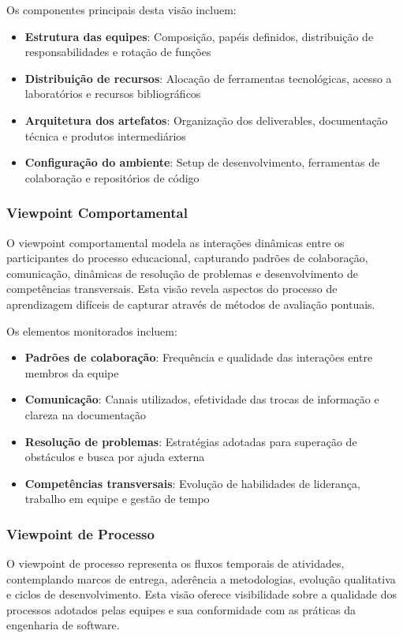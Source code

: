 \documentclass[english, spanish, brazilian]{modelo_dt}
\begin{document}
Os componentes principais desta visão incluem:
\begin{itemize}
  \item \textbf{Estrutura das equipes}: Composição, papéis definidos, distribuição de responsabilidades e rotação de funções
  \item \textbf{Distribuição de recursos}: Alocação de ferramentas tecnológicas, acesso a laboratórios e recursos bibliográficos
  \item \textbf{Arquitetura dos artefatos}: Organização dos deliverables, documentação técnica e produtos intermediários
  \item \textbf{Configuração do ambiente}: Setup de desenvolvimento, ferramentas de colaboração e repositórios de código
\end{itemize}

\subsubsection{Viewpoint Comportamental}

O viewpoint comportamental modela as interações dinâmicas entre os
participantes do processo educacional, capturando padrões de colaboração,
comunicação, dinâmicas de resolução de problemas e desenvolvimento de
competências transversais\@. Esta visão revela aspectos do processo de
aprendizagem difíceis de capturar através de métodos de avaliação pontuais\@.

Os elementos monitorados incluem:
\begin{itemize}
  \item \textbf{Padrões de colaboração}: Frequência e qualidade das interações entre membros da equipe
  \item \textbf{Comunicação}: Canais utilizados, efetividade das trocas de informação e clareza na documentação
  \item \textbf{Resolução de problemas}: Estratégias adotadas para superação de obstáculos e busca por ajuda externa
  \item \textbf{Competências transversais}: Evolução de habilidades de liderança, trabalho em equipe e gestão de tempo
\end{itemize}

\subsubsection{Viewpoint de Processo}

O viewpoint de processo representa os fluxos temporais de atividades,
contemplando marcos de entrega, aderência a metodologias, evolução qualitativa
e ciclos de desenvolvimento\@. Esta visão oferece visibilidade sobre a
qualidade dos processos adotados pelas equipes e sua conformidade com as
práticas da engenharia de software\@.
\end{document}
